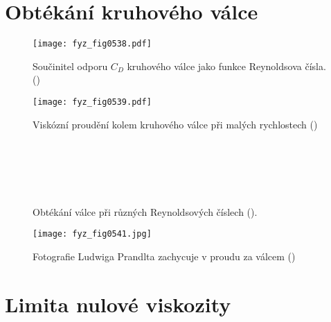   \section{Obtékání kruhového válce}\label{fyz:IIchapXLIsecIV}
  
    \begin{figure}[ht!] %
      \centering
      \texttt{[image: fyz\_fig0538.pdf]}
      \caption{Součinitel odporu \(C_D\) kruhového válce jako funkce Reynoldsova čísla.
               (\cite[s.~766]{Feynman02})}
      \label{fyz:fig0538}
    \end{figure}
     
    \begin{figure}[ht!] %
      \centering
      \texttt{[image: fyz\_fig0539.pdf]}
      \caption{Viskózní proudění kolem kruhového válce při malých rychlostech
              (\cite[s.~707]{Feynman02})}
      \label{fyz:fig0539}
    \end{figure}   

    \begin{figure}[hb!] %
      \centering
        \\
        \\
        \\
        \\
      \caption{Obtékání válce při různých Reynoldsových číslech
               (\cite[s.~768]{Feynman02}).}
      \label{fyz:fig0540}
    \end{figure}

    \begin{figure}[ht!] %
      \centering
      \texttt{[image: fyz\_fig0541.jpg]}
      \caption{Fotografie Ludwiga Prandlta zachycuje  v proudu za válcem
               (\cite[s.~707]{Feynman02})}
      \label{fyz:fig0541}
    \end{figure}
    
  \section{Limita nulové viskozity}\label{fyz:IIchapXLIsecV}
